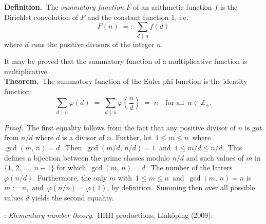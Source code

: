 \documentclass[12pt]{article}
\theoremstyle{definition}
\begin{document}
\textbf{Definition.}\, The \emph{summatory function} $F$ of an arithmetic function $f$ is the Dirichlet convolution of $F$ and the constant function 1, i.e. 
$$F(n) \;=:\; \sum_{d\,\mid\,n}f(d)$$
where $d$ runs the positive divisors of the integer $n$.

It may be proved that the summatory function of a multiplicative function is multiplicative.\\

\textbf{Theorem.}\, The summatory function of the Euler phi function is the identity function:
$$\sum_{d\,\mid\,n}\varphi(d) \;=\; \sum_{d\,\mid\,n}\varphi\left(\frac{n}{d}\right) \;=\; n 
\quad \mbox{for all }\, n \in \mathbb{Z}_+.$$

\emph{Proof.}\, The first equality follows from the fact that any positive divisor of
$n$ is got from $n/d$ where $d$ is a divisor of $n$.
Further, let\, $1 \le m \le n$\, where\, $\gcd(m,\,n) = d$.\, Then\, $\gcd(m/d,\,n/d) = 1$\, and\,
$1 \le m/d \le n/d$.\, This defines a bijection between the prime classes modulo $n/d$ and such values of $m$ in $\{1,\,2,\,\ldots,\,n\!-\!1\}$ for which\, $\gcd(m,\,n) = d$.\, The number of the latters $\varphi(n/d)$.
Furthermore, the only $m$ with\, $1 \le m \le n$\, and\, $\gcd(m,\,n) = n$ is\, $m := n$,\, and\, $\varphi(n/n) = \varphi(1)$, by definition.\, Summing then over all possible values $d$ yields the second equality.

\begin{thebibliography}{8}
: {\em Elementary number theory}.\, HHH productions, Link\"oping (2009).
\end{thebibliography} 

\end{document}
